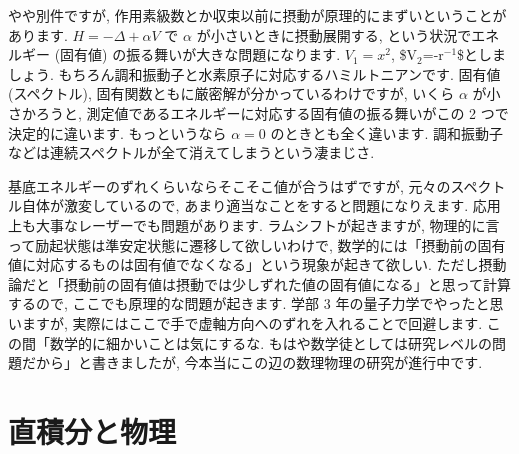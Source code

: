 \documentclass[openany, a4paper, oneside]{jsbook}
\theoremstyle{break}
\theoremstyle{breakdefn}
\begin{document}
やや別件ですが, 作用素級数とか収束以前に摂動が原理的にまずいということがあります.
$H = - \Delta + \alpha V$ で $\alpha$ が小さいときに摂動展開する,
という状況でエネルギー (固有値) の振る舞いが大きな問題になります.
$V_1 = x^2$, \$V$_2$=-r$^{\mathrm{-1}}$\$としましょう.
もちろん調和振動子と水素原子に対応するハミルトニアンです.
固有値 (スペクトル), 固有関数ともに厳密解が分かっているわけですが,
いくら $\alpha$ が小さかろうと, 測定値であるエネルギーに対応する固有値の振る舞いがこの 2 つで決定的に違います.
もっというなら $\alpha = 0$ のときとも全く違います.
調和振動子などは連続スペクトルが全て消えてしまうという凄まじさ.

基底エネルギーのずれくらいならそこそこ値が合うはずですが,
元々のスペクトル自体が激変しているので, あまり適当なことをすると問題になりえます.
応用上も大事なレーザーでも問題があります.
ラムシフトが起きますが, 物理的に言って励起状態は準安定状態に遷移して欲しいわけで,
数学的には「摂動前の固有値に対応するものは固有値でなくなる」という現象が起きて欲しい.
ただし摂動論だと「摂動前の固有値は摂動では少しずれた値の固有値になる」と思って計算するので, ここでも原理的な問題が起きます.
学部 3 年の量子力学でやったと思いますが, 実際にはここで手で虚軸方向へのずれを入れることで回避します.
この間「数学的に細かいことは気にするな.
もはや数学徒としては研究レベルの問題だから」と書きましたが,
今本当にこの辺の数理物理の研究が進行中です.
\chapter{直積分と物理}
\end{document}
